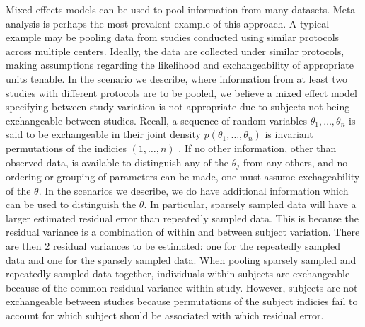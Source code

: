 Mixed effects models can be used to pool information from many datasets.  Meta-analysis is perhaps the most prevalent example of this approach.  A typical example may be pooling data from studies conducted using similar protocols across multiple centers.  Ideally, the data are collected under similar protocols, making assumptions regarding the likelihood and exchangeability of appropriate units tenable.  In the scenario we describe, where information from at least two studies with different protocols are to be pooled, we believe a mixed effect model specifying between study variation is not appropriate due to subjects not being exchangeable between studies.  Recall, a sequence of random variables $\theta_1, \dots, \theta_n$ is said to be exchangeable in their joint density $p(\theta_1, \dots, \theta_n)$ is invariant permutations of the indicies $(1, \dots, n)$ \cite{gelman1995bayesian}.  If no other information, other than observed data, is available to distinguish any of the $\theta_j$ from any others, and no ordering or grouping of parameters can be made, one must assume exchageability of the $\theta$.  In the scenarios we describe, we do have additional information which can be used to distinguish the $\theta$.  In particular, sparsely sampled data will have a larger estimated residual error than repeatedly sampled data.  This is because the residual variance is a combination of within and between subject variation. There are then 2 residual variances to be estimated: one for the repeatedly sampled data and one for the sparsely sampled data.  When pooling sparsely sampled and repeatedly sampled data together, individuals within subjects are exchangeable because of the common residual variance within study. However, subjects are not exchangeable between studies because permutations of the subject indicies fail to account for which subject should be associated with which residual error.
